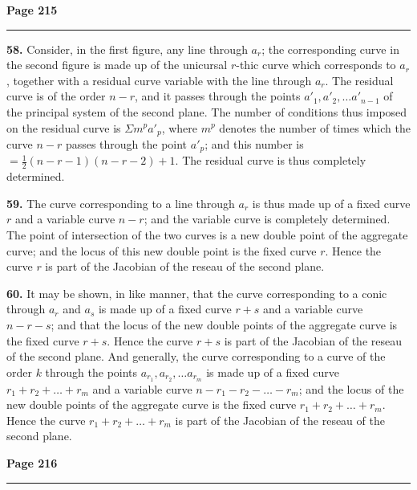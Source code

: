 \documentclass[12pt,a4paper]{article}
\theoremstyle{plain}
\theoremstyle{definition}
\theoremstyle{remark}
\begin{document}
\newpage
\noindent\textbf{Page 215}\\
\noindent\rule{\textwidth}{0.4pt}

\smallskip

\noindent\textbf{58.} Consider, in the first figure, any line through $a_r$; the corresponding curve in the second figure is made up of the unicursal $r$-thic curve which corresponds to $a_r$, together with a residual curve variable with the line through $a_r$. The residual curve is of the order $n - r$, and it passes through the points $a'_1, a'_2, \ldots a'_{n-1}$ of the principal system of the second plane. The number of conditions thus imposed on the residual curve is $\Sigma m^p a'_p$, where $m^p$ denotes the number of times which the curve $n - r$ passes through the point $a'_p$; and this number is $= \frac{1}{2}(n - r - 1)(n - r - 2) + 1$. The residual curve is thus completely determined.

\textbf{59.} The curve corresponding to a line through $a_r$ is thus made up of a fixed curve $r$ and a variable curve $n - r$; and the variable curve is completely determined. The point of intersection of the two curves is a new double point of the aggregate curve; and the locus of this new double point is the fixed curve $r$. Hence the curve $r$ is part of the Jacobian of the reseau of the second plane.

\textbf{60.} It may be shown, in like manner, that the curve corresponding to a conic through $a_r$ and $a_s$ is made up of a fixed curve $r + s$ and a variable curve $n - r - s$; and that the locus of the new double points of the aggregate curve is the fixed curve $r + s$. Hence the curve $r + s$ is part of the Jacobian of the reseau of the second plane. And generally, the curve corresponding to a curve of the order $k$ through the points $a_{r_1}, a_{r_2}, \ldots a_{r_m}$ is made up of a fixed curve $r_1 + r_2 + \ldots + r_m$ and a variable curve $n - r_1 - r_2 - \ldots - r_m$; and the locus of the new double points of the aggregate curve is the fixed curve $r_1 + r_2 + \ldots + r_m$. Hence the curve $r_1 + r_2 + \ldots + r_m$ is part of the Jacobian of the reseau of the second plane.

\newpage
\noindent\textbf{Page 216}\\
\noindent\rule{\textwidth}{0.4pt}

\smallskip
\end{document}

